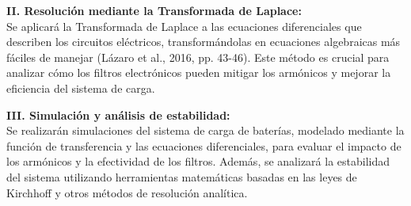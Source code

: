 \textbf{II. Resolución mediante la Transformada de Laplace:}\\
Se aplicará la Transformada de Laplace a las ecuaciones diferenciales que describen
los circuitos eléctricos, transformándolas en ecuaciones algebraicas más fáciles de
manejar (Lázaro et al., 2016, pp. 43-46). Este método es crucial para analizar cómo
los filtros electrónicos pueden mitigar los armónicos y mejorar la eficiencia del
sistema de carga.

\textbf{III. Simulación y análisis de estabilidad:}\\
Se realizarán simulaciones del sistema de carga de baterías, modelado mediante la
función de transferencia y las ecuaciones diferenciales, para evaluar el impacto de
los armónicos y la efectividad de los filtros. Además, se analizará la estabilidad del
sistema utilizando herramientas matemáticas basadas en las leyes de Kirchhoff y
otros métodos de resolución analítica.
